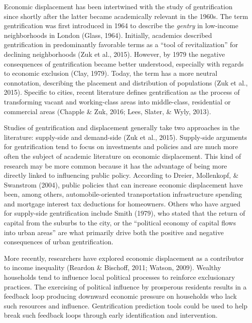 \documentclass[conference,final,]{IEEEtran}
\begin{document}
Economic displacement has been intertwined with the study of
gentrification since shortly after the latter became academically
relevant in the 1960s. The term gentrification was first introduced in
1964 to describe the \emph{gentry} in low-income neighborhoods in London
(Glass, 1964). Initially, academics described gentrification in
predominantly favorable terms as a ``tool of revitalization'' for
declining neighborhoods (Zuk et al., 2015). However, by 1979 the
negative consequences of gentrification became better understood,
especially with regards to economic exclusion (Clay, 1979). Today, the
term has a more neutral connotation, describing the placement and
distribution of populations (Zuk et al., 2015). Specific to cities,
recent literature defines gentrification as the process of transforming
vacant and working-class areas into middle-class, residential or
commercial areas (Chapple \& Zuk, 2016; Lees, Slater, \& Wyly, 2013).

Studies of gentrification and displacement generally take two approaches
in the literature: supply-side and demand-side (Zuk et al., 2015).
Supply-side arguments for gentrification tend to focus on investments
and policies and are much more often the subject of academic literature
on economic displacement. This kind of research may be more common
because it has the advantage of being more directly linked to
influencing public policy. According to Dreier, Mollenkopf, \& Swanstrom
(2004), public policies that can increase economic displacement have
been, among others, automobile-oriented transportation infrastructure
spending and mortgage interest tax deductions for homeowners. Others who
have argued for supply-side gentrification include Smith (1979), who
stated that the return of capital from the suburbs to the city, or the
``political economy of capital flows into urban areas'' are what
primarily drive both the positive and negative consequences of urban
gentrification.

More recently, researchers have explored economic displacement as a
contributor to income inequality (Reardon \& Bischoff, 2011; Watson,
2009). Wealthy households tend to influence local political processes to
reinforce exclusionary practices. The exercising of political influence
by prosperous residents results in a feedback loop producing downward
economic pressure on households who lack such resources and influence.
Gentrification prediction tools could be used to help break such
feedback loops through early identification and intervention.
\end{document}

